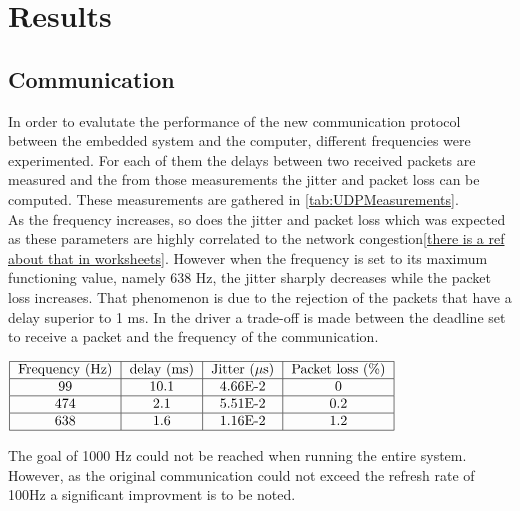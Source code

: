 \section{Results}

\subsection{Communication}
 In order to evalutate the performance of the new communication protocol between the embedded system and the computer, different frequencies were experimented. For each of them the delays between two received packets are measured and the from those measurements the jitter and packet loss can be computed. These measurements are gathered in \ref{tab:UDPMeasurements}.\\
 As the frequency increases, so does  the jitter and packet loss which was expected as these parameters are highly correlated to the network congestion\ref{there is a ref about that in worksheets}. However when the frequency is set to its maximum functioning value, namely 638 Hz, the jitter sharply decreases while the packet loss increases. That phenomenon is due to the rejection of the packets that have a delay superior to 1 ms. In the driver a trade-off is made between the deadline set to receive a packet and the frequency of the communication. 
\begin{center}
  $\begin{tabular}{|c|c|c|c|c|c|}
    \hline
    \text{Frequency (Hz)} & \text{delay (ms)} & \text{Jitter ($\mu$s)} & \text{Packet loss (\%)}\\
    \hline
    99 & 10.1 & 4.66E-2 & 0 \\
    \hline
    474 & 2.1 & 5.51E-2 & 0.2 \\
    \hline
    638 & 1.6 & 1.16E-2 & 1.2 \\
    \hline
  \end{tabular}$
  \label{tab:UDPMeasurements}
\end{center}
The goal of 1000 Hz could not be reached when running the entire system. However, as the original communication could not exceed the refresh rate of 100Hz a significant improvment is to be noted.

